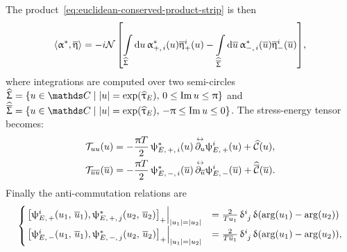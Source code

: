 The product~\eqref{eq:euclidean-conserved-product-strip} is then
\begin{equation}
  \left\langle \upalpha^*, \overline{\upeta} \right\rangle
  =
  -i \mathcal{N}\,
  \qty[
    \int\limits_{\widehat{\Upsigma}} \dd{u}
    \upalpha^*_{+,\, i}(u) \overline{\upeta}_+^i(u)
    -
    \int\limits_{\widehat{\overline{\Upsigma}}} \dd{\ensuremath{\overline{u}}}
    \upalpha^*_{-,\, i}(\overline{u}) \overline{\upeta}_-^i(\overline{u})
  ],
  \label{eq:prod_H}
\end{equation}
where integrations are computed over two semi-circles $\widehat{\Sigma} = \qty{ u \in \C \mid \abs{u} = \exp( \htau_E ),\, 0 \le \Im u \le \pi }$ and $\widehat{\overline{\Sigma}} = \qty{ u \in \C \mid \abs{u} = \exp( \htau_E ),\, -\pi \le \Im u \le 0}$.
The stress-energy tensor becomes:\footnotemark{}
\begin{equation}
  \begin{split}
    \mathcal{T}_{u u}( u )
    & =
    - \frac{\uppi T}{2}\,
    \uppsi_{E,\, +,\, i}^*( u )\, \overset{\leftrightarrow}{\partial_{u}} \uppsi^i_{E,\, +}( u )
    +
    \widehat{\mathcal{C}}(u ),
    \\
    \mathcal{T}_{\overline{u} \overline{u}}( \overline{u} )
    & =
    - \frac{\uppi T}{2}\,
    \uppsi_{E,\, -,\, i}^*( \overline{u} )\, \overset{\leftrightarrow}{\partial_{\overline{u}}} \uppsi^i_{E,\, -}( \overline{u} )
    +
    \widehat{\overline{\mathcal{C}}}( \overline{u} ).
  \end{split}
\end{equation}
Finally the anti-commutation relations are
\begin{equation}
  \begin{cases}
    \eval{
      \qty[
        \psi_{E,\, +}^i( u_1,\, \baru_1 )
        ,
        \psi_{E,\, +,\, j}^*( u_2,\, \baru_2 )
      ]_+
    }_{\abs{u_1} = \abs{u_2}}
    & =
    \frac{2}{T u_1}\, \tensor{\delta}{^i_j}\, \delta( \arg(u_1) - \arg(u_2) )
    \\
    \eval{
      \qty[
        \psi_{E,\, -}^i( u_1,\, \baru_1 )
        ,
        \psi_{E,\, -,\, j}^*( u_2,\, \baru_2 )
      ]_+
    }_{\abs{u_1} = \abs{u_2}}
    & =
    \frac{2}{T \baru_1}\, \tensor{\delta}{^i_j}\, \delta( \arg(u_1) - \arg(u_2) ),
  \end{cases}
\end{equation}
